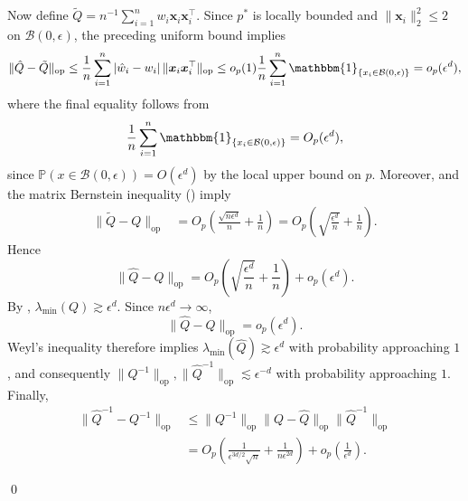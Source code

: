 \documentclass[11pt]{article}
\begin{document}
\begin{appendices}
Now define $\tilde Q=n^{-1}\sum_{i=1}^nw_i\boldsymbol{x}_i\boldsymbol{x}_i^\top$. Since $p^*$ is locally bounded and $\|\boldsymbol{x}_i\|_2^2\leq2$ on $\mathcal B(0,\epsilon)$, the preceding uniform bound implies
\begin{align*}
    \|\hat Q-\tilde Q\|_{\operatorname{op}}
    \leq \frac{1}{n}\sum_{i=1}^n
    |\hat w_i-w_i|\,\|\boldsymbol{x}_i\boldsymbol{x}_i^\top\|_{\operatorname{op}} \leq
    o_p(1)\frac{1}{n}\sum_{i=1}^n
    \mathbbm{1}_{\{x_i\in\mathcal B(0,\epsilon)\}} =o_p(\epsilon^d),
\end{align*}
where the final equality follows from
\[
\frac{1}{n}\sum_{i=1}^n
\mathbbm{1}_{\{x_i\in\mathcal B(0,\epsilon)\}}
=O_p(\epsilon^d),
\]
since $\mathbb P(x\in\mathcal B(0,\epsilon))=O(\epsilon^d)$ by the local upper bound on $p$. Moreover,  and the matrix Bernstein inequality () imply
\begin{align*}
    \|\tilde Q-Q\|_{\operatorname{op}}
    &= O_p\left(\frac{\sqrt{n\epsilon^d}}{n}+\frac{1}{n}\right) = O_p\left(\sqrt{\frac{\epsilon^d}{n}}+\frac{1}{n}\right).
\end{align*}
Hence
\[
    \|\hat Q-Q\|_{\operatorname{op}}
    =
    O_p\left(\sqrt{\frac{\epsilon^d}{n}}+\frac{1}{n}\right)
    +o_p(\epsilon^d).
\]
By , $\lambda_{\min}(Q)\gtrsim\epsilon^d$. Since $n\epsilon^d\rightarrow\infty$,
\[
    \|\hat Q-Q\|_{\operatorname{op}}=o_p(\epsilon^d).
\]
Weyl's inequality therefore implies $\lambda_{\min}(\hat Q)\gtrsim\epsilon^d$ with probability approaching $1$, and consequently $\|Q^{-1}\|_{\operatorname{op}},\|\hat Q^{-1}\|_{\operatorname{op}}\lesssim\epsilon^{-d}$ with probability approaching $1$. Finally,
\begin{align*}
    \|\hat Q^{-1}-Q^{-1}\|_{\operatorname{op}}
    &\leq \|Q^{-1}\|_{\operatorname{op}}
    \|Q-\hat Q\|_{\operatorname{op}}
    \|\hat Q^{-1}\|_{\operatorname{op}} \\
    &=
    O_p\left(\frac{1}{\epsilon^{3d/2}\sqrt n}
    +\frac{1}{n\epsilon^{2d}}\right)
    +o_p\left(\frac{1}{\epsilon^d}\right).
\end{align*}

\qed{}



\end{appendices}
\end{document}
